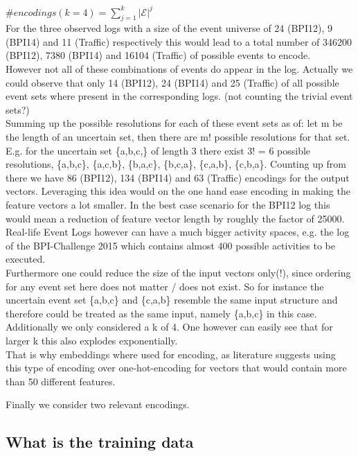 \documentclass[
	a4paper,
	pagesize,
	pdftex,
	12pt,
	ngerman,
	fleqn,
	final,
	]{scrartcl}
\theoremstyle{plain}
\theoremstyle{definition}
\begin{document}
	\(\#encodings(k=4)= \sum_{j=1}^{k}|\mathcal{E}|^j\) \\
	For the three observed logs with a size of the event universe of 24 (BPI12), 9 (BPI14) and 11 (Traffic) respectively this would lead to a total number of 346200 (BPI12), 7380 (BPI14) and 16104 (Traffic) of possible events to encode. \\
	However not all of these combinations of events do appear in the log. Actually we could observe that only 14 (BPI12), 24 (BPI14) and 25 (Traffic) of all possible event sets where present in the corresponding logs. (not counting the trivial event sets?) \\
	Summing up the possible resolutions for each of these event sets as of: let m be the length of an uncertain set, then there are m! possible resolutions for that set. E.g. for the uncertain set \{a,b,c,\} of length 3 there exist 3! = 6 possible resolutions, \{a,b,c\}, \{a,c,b\}, \{b,a,c\}, \{b,c,a\}, \{c,a,b\}, \{c,b,a\}. Counting up from there we have 86 (BPI12), 134 (BPI14) and 63 (Traffic) encodings for the output vectors.
	Leveraging this idea would on the one hand ease encoding in making the feature vectors a lot smaller. In the best case scenario for the BPI12 log this would mean a reduction of feature vector length by roughly the factor of 25000. \\ 
	Real-life Event Logs however can have a much bigger activity spaces, e.g. the log of the BPI-Challenge 2015 which contains almost 400 possible activities to be executed. \\
	Furthermore one could reduce the size of the input vectors only(!), since ordering for any event set here does not matter / does not exist. So for instance the uncertain event set \{a,b,c\} and \{c,a,b\} resemble the same input structure and therefore could be treated as the same input, namely \{a,b,c\} in this case. \\
	Additionally we only considered a k of 4. One however can easily see that for larger k this also explodes exponentially. \\
	That is why embeddings where used for encoding, as literature suggests using this type of encoding over one-hot-encoding for vectors that would contain more than 50 different features.
	
	Finally we consider two relevant encodings.
	
	\subsection{What is the training data}
	 
\end{document}
